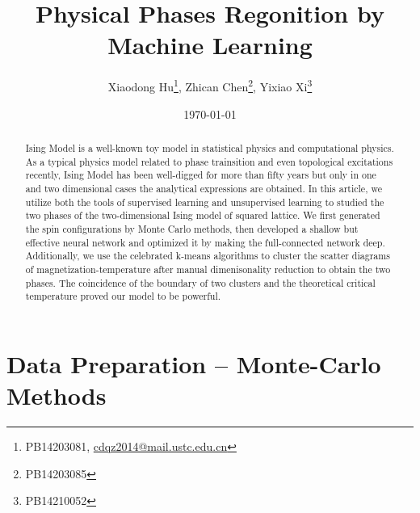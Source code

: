 \documentclass[prl,aps,twocolumn]{revtex4}
\begin{document}

\title{Physical Phases Regonition by Machine Learning}
\author{Xiaodong Hu\footnote{PB14203081, \url{cdqz2014@mail.ustc.edu.cn}}, Zhican Chen\footnote{PB14203085}, Yixiao Xi\footnote{PB14210052}}
\date{\today}

\begin{abstract}
Ising Model is a well-known toy model in statistical physics and computational physics. As a typical physics model related to phase trainsition and even topological excitations recently, Ising Model has been well-digged for more than fifty years but only in one and two dimensional cases the analytical expressions are obtained. In this article, we utilize both the tools of supervised learning and unsupervised learning to studied the two phases of the two-dimensional Ising model of squared lattice. We first generated the spin configurations by Monte Carlo methods, then developed a shallow but effective neural network and optimized it by making the full-connected network deep. Additionally, we use the celebrated k-means algorithms to cluster the scatter diagrams of magnetization-temperature after manual dimenisonality reduction to obtain the two phases. The coincidence of the boundary of two clusters and the theoretical critical temperature proved our model to be powerful. 
\end{abstract}

\pacs{}
\maketitle

\section{Data Preparation -- Monte-Carlo Methods}
\end{document}
